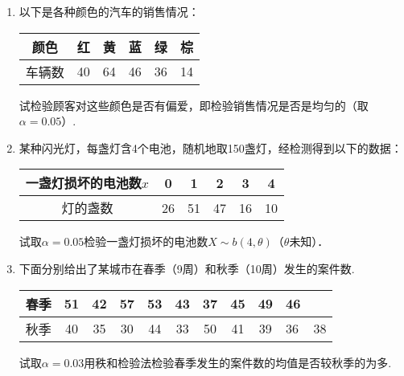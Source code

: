 \documentclass[10pt,a4paper]{article}
\begin{document}
\begin{enumerate}
    \item 以下是各种颜色的汽车的销售情况：
    \renewcommand{\arraystretch}{1.3}
    \begin{table}[H]\centering
        \begin{tabular}{c|c|c|c|c|c}
        \hline
        颜色  & 红  & 黄  & 蓝  & 绿  & 棕  \\ \hline
        车辆数 & 40 & 64 & 46 & 36 & 14 \\ \hline
        \end{tabular}
    \end{table}
    \renewcommand{\arraystretch}{1.0}
    试检验顾客对这些颜色是否有偏爱，即检验销售情况是否是均匀的（取$\alpha=0.05$）.






    \item 某种闪光灯，每盏灯含4个电池，随机地取150盏灯，经检测得到以下的数据：
    \renewcommand{\arraystretch}{1.3}
    \begin{table}[H]\centering
        \begin{tabular}{c|c|c|c|c|c}
        \hline
        一盏灯损坏的电池数$x$ & 0  & 1  & 2  & 3  & 4  \\ \hline
        灯的盏数         & 26 & 51 & 47 & 16 & 10 \\ \hline
        \end{tabular}
    \end{table}
    \renewcommand{\arraystretch}{1.0}
    试取$\alpha=0.05$检验一盏灯损坏的电池数$X\sim b(4,\theta)$（$\theta$未知）．





    \item 下面分别给出了某城市在春季（9周）和秋季（10周）发生的案件数.
    \renewcommand{\arraystretch}{1.3}
    \begin{table}[H]\centering
        \begin{tabular}{c|ccccccccll}
        \hline
        春季 & 51 & 42 & 57 & 53 & 43 & 37 & 45 & 49 & 46 &    \\ \hline
        秋季 & 40 & 35 & 30 & 44 & 33 & 50 & 41 & 39 & 36 & 38 \\ \hline
        \end{tabular}
    \end{table}
    \renewcommand{\arraystretch}{1.0}
    试取$\alpha=0.03$用秩和检验法检验春季发生的案件数的均值是否较秋季的为多.




\end{enumerate}
\end{document}

